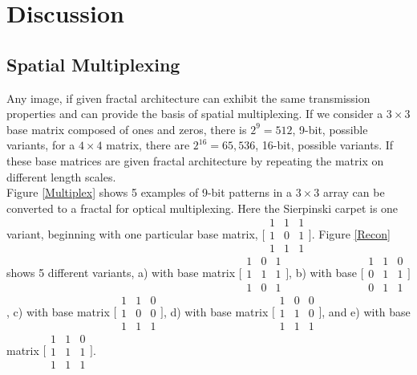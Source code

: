 \section{Discussion}
\subsection{Spatial Multiplexing}
Any image, if given fractal architecture can exhibit the same transmission properties and can provide the basis of spatial multiplexing. If we consider a $3\times 3$ base matrix composed of ones and zeros, there is $2^9 = 512$, 9-bit, possible variants, for a $4\times 4$ matrix, there are $2^16 = 65,536$, 16-bit, possible variants. If these base matrices are given fractal architecture by repeating the matrix on different length scales.\\
Figure \ref{Multiplex} shows 5 examples of 9-bit patterns in a $3\times 3 $ array can be converted to a fractal for optical multiplexing. Here the Sierpinski carpet is one variant, beginning with one particular base matrix, $\Big[\begin{smallmatrix} 1 & 1 & 1 \\ 1 & 0 & 1\\ 1 & 1 & 1\end{smallmatrix}\Big]$. Figure \ref{Recon} shows 5 different variants, a) with base matrix  $\Big[\begin{smallmatrix} 1 & 0 & 1 \\ 1 & 1 & 1\\ 1 & 0 & 1\end{smallmatrix}\Big]$, b) with base  $\Big[\begin{smallmatrix} 1 & 1 & 0 \\ 0 & 1 & 1\\ 0 & 1 & 1\end{smallmatrix}\Big]$, c) with base matrix  $\Big[\begin{smallmatrix} 1 & 1 & 0 \\ 1 & 0 & 0\\ 1 & 1 & 1\end{smallmatrix}\Big]$, d) with base matrix  $\Big[\begin{smallmatrix} 1 & 0 & 0 \\ 1 & 1 & 0\\ 1 & 1 & 1\end{smallmatrix}\Big]$, and e) with base matrix  $\Big[\begin{smallmatrix} 1 & 1 & 0 \\ 1 & 1 & 1\\ 1 & 1 & 1\end{smallmatrix}\Big]$.\\
